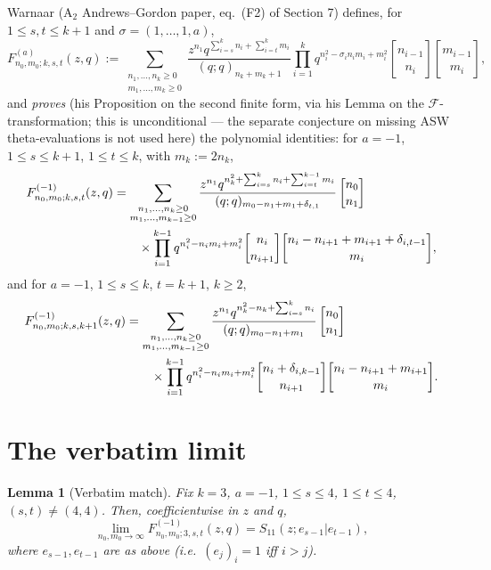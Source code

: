 \documentclass[11pt]{article}
\newtheorem{lemma}[theorem]{Lemma}
\newcommand{\qbin}[2]{\genfrac{[}{]}{0pt}{}{#1}{#2}}
\newcommand{\poch}[1]{(q;q)_{#1}}
\begin{document}
Warnaar ($\mathrm{A}_2$ Andrews--Gordon paper, eq.\ (F2) of Section 7)
defines, for $1\le s,t\le k+1$ and $\sigma=(1,\dots,1,a)$,
\begin{equation}\label{eq:F2}
F_{n_0,m_0;k,s,t}^{(a)}(z,q):=
\sum_{\substack{n_1,\dots,n_k\ge 0\\ m_1,\dots,m_k\ge 0}}
\frac{z^{n_1}q^{\sum_{i=s}^k n_i+\sum_{i=t}^k m_i}}{\poch{n_k+m_k+1}}
\prod_{i=1}^k q^{n_i^2-\sigma_in_im_i+m_i^2}
\qbin{n_{i-1}}{n_i}\qbin{m_{i-1}}{m_i},
\end{equation}
and \emph{proves} (his Proposition on the second finite form, via his Lemma
on the $\mathcal{F}$-transformation; this is unconditional --- the separate
conjecture on missing ASW theta-evaluations is not used here) the polynomial
identities: for $a=-1$, $1\le s\le k+1$, $1\le t\le k$, with $m_k:=2n_k$,
\begin{align}\label{eq:mineen}
F_{n_0,m_0;k,s,t}^{(-1)}(z,q)&=
\sum_{\substack{n_1,\dots,n_k\ge 0\\ m_1,\dots,m_{k-1}\ge 0}}
\frac{z^{n_1} q^{n_k^2+\sum_{i=s}^k n_i+\sum_{i=t}^{k-1} m_i}}
{\poch{m_0-n_1+m_1+\delta_{t,1}}}\, \qbin{n_0}{n_1}\\
&\qquad\times\prod_{i=1}^{k-1} q^{n_i^2-n_im_i+m_i^2}
\qbin{n_i}{n_{i+1}}
\qbin{n_i-n_{i+1}+m_{i+1}+\delta_{i,t-1}}{m_i},\notag
\end{align}
and for $a=-1$, $1\le s\le k$, $t=k+1$, $k\ge 2$,
\begin{align}\label{eq:mineen2}
F_{n_0,m_0;k,s,k+1}^{(-1)}(z,q)&=
\sum_{\substack{n_1,\dots,n_k\ge 0\\ m_1,\dots,m_{k-1}\ge 0}}
\frac{z^{n_1} q^{n_k^2-n_k+\sum_{i=s}^k n_i}}{\poch{m_0-n_1+m_1}}\,
\qbin{n_0}{n_1}\\
&\qquad\times\prod_{i=1}^{k-1} q^{n_i^2-n_im_i+m_i^2}
\qbin{n_i+\delta_{i,k-1}}{n_{i+1}}\qbin{n_i-n_{i+1}+m_{i+1}}{m_i}.\notag
\end{align}

\section{The verbatim limit}

\begin{lemma}[Verbatim match]\label{lem:verbatim}
Fix $k=3$, $a=-1$, $1\le s\le 4$, $1\le t\le 4$, $(s,t)\ne(4,4)$. Then,
coefficientwise in $z$ and $q$,
\[
\lim_{n_0,m_0\to\infty}F^{(-1)}_{n_0,m_0;3,s,t}(z,q)
=S_{11}(z;e_{s-1}|e_{t-1}),
\]
where $e_{s-1},e_{t-1}$ are as above (i.e.\ $(e_{j})_i=1$ iff $i>j$).
\end{lemma}
\end{document}
